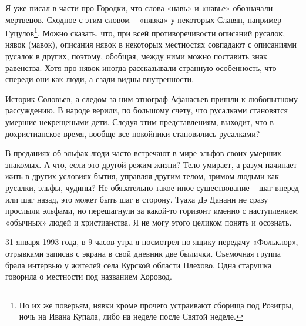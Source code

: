 Я уже писал в части про Городки, что слова «навь» и «навье» обозначали мертвецов. Сходное с этим словом – «нявка» у некоторых Славян, например Гуцулов\footnote{По их же поверьям, нявки кроме прочего устраивают сборища под Розигры, ночь на Ивана Купала, либо на неделе после Святой неделе.}. Можно сказать, что, при всей противоречивости описаний русалок, нявок (мавок), описания нявок в некоторых местностях совпадают с описаниями русалок в других, поэтому, обобщая, между ними можно поставить знак равенства. Хотя про нявок иногда рассказывали странную особенность, что спереди они как люди, а сзади видны внутренности.



Историк Соловьев, а следом за ним этнограф Афанасьев  пришли к любопытному рассуждению. В народе верили, по большому счету, что русалками становятся умершие некрещеными дети. Следуя этим представлениям, выходит, что в дохристианское время, вообще все покойники становились русалками?

В преданиях об эльфах люди часто встречают в мире эльфов своих умерших знакомых. А что, если это другой режим жизни? Тело умирает, а разум начинает жить в других условиях бытия, управляя другим телом, зримом людьми как русалки, эльфы, чудины? Не обязательно такое иное существование – шаг вперед или шаг назад, это может быть шаг в сторону. Туаха Дэ Дананн не сразу прослыли эльфами, но перешагнули за какой-то горизонт именно с наступлением «обычных» людей и христианства. Я не могу этого целиком понять и осознать.

31 января 1993 года, в 9 часов утра я посмотрел по ящику передачу «Фольклор», отрывками записав с экрана в свой дневник две былички. Съемочная группа брала интервью у жителей села Курской области Плехово. Одна старушка говорила о местности под названием Хоровод. 


